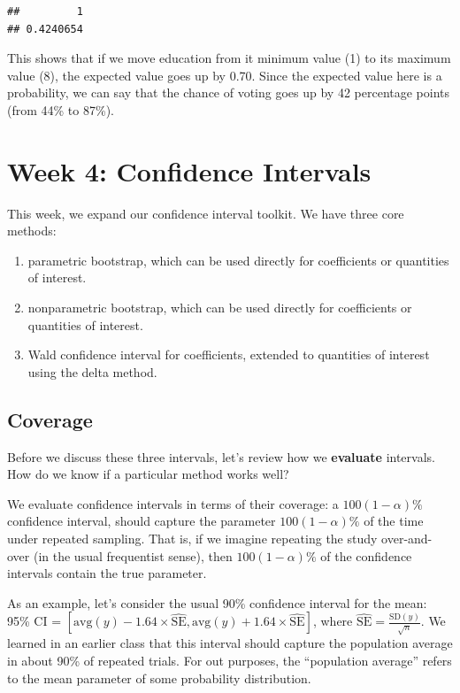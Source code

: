\documentclass[
]{book}
\providecommand{\tightlist}{%
  \setlength{\itemsep}{0pt}\setlength{\parskip}{0pt}}
\begin{document}
\begin{verbatim}
##         1 
## 0.4240654
\end{verbatim}

This shows that if we move education from it minimum value (1) to its
maximum value (8), the expected value goes up by 0.70. Since the
expected value here is a probability, we can say that the chance of
voting goes up by 42 percentage points (from 44\% to 87\%).

\hypertarget{week-4-confidence-intervals}{%
\chapter{Week 4: Confidence
Intervals}\label{week-4-confidence-intervals}}

This week, we expand our confidence interval toolkit. We have three core
methods:

\begin{enumerate}
\def\labelenumi{\arabic{enumi}.}
\tightlist
\item
  parametric bootstrap, which can be used directly for coefficients or
  quantities of interest.
\item
  nonparametric bootstrap, which can be used directly for coefficients
  or quantities of interest.
\item
  Wald confidence interval for coefficients, extended to quantities of
  interest using the delta method.
\end{enumerate}

\hypertarget{coverage}{%
\section{Coverage}\label{coverage}}

Before we discuss these three intervals, let's review how we
\textbf{evaluate} intervals. How do we know if a particular method works
well?

We evaluate confidence intervals in terms of their coverage: a
\(100(1 - \alpha)\%\) confidence interval, should capture the parameter
\(100(1 - \alpha)\%\) of the time under repeated sampling. That is, if
we imagine repeating the study over-and-over (in the usual frequentist
sense), then \(100(1 - \alpha)\%\) of the confidence intervals contain
the true parameter.

As an example, let's consider the usual 90\% confidence interval for the
mean: 95\% CI =
\([\text{avg}(y) - 1.64 \times \hat{\text{SE}}, \text{avg}(y) + 1.64 \times \hat{\text{SE}}]\),
where \(\hat{\text{SE}} = \frac{\text{SD}(y)}{\sqrt{n}}\). We learned in
an earlier class that this interval should capture the population
average in about 90\% of repeated trials. For out purposes, the
``population average'' refers to the mean parameter of some probability
distribution.
\end{document}
